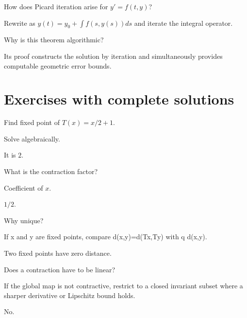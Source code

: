 \begin{problem}\label{prob:ii16-problem-11}
How does Picard iteration arise for $y'=f(t,y)$?
\end{problem}
\begin{solution}
Rewrite as $y(t)=y_0+\int f(s,y(s))ds$ and iterate the integral operator.
\end{solution}

\begin{problem}\label{prob:ii16-problem-12}
Why is this theorem algorithmic?
\end{problem}
\begin{solution}
Its proof constructs the solution by iteration and simultaneously provides computable geometric error bounds.
\end{solution}

\section{Exercises with complete solutions}

\begin{exercise}\label{exr:ii16-01}
Find fixed point of $T(x)=x/2+1$.
\end{exercise}
\begin{hint}
Solve algebraically.
\end{hint}
\begin{solution}
It is $2$.
\end{solution}

\begin{exercise}\label{exr:ii16-02}
What is the contraction factor?
\end{exercise}
\begin{hint}
Coefficient of $x$.
\end{hint}
\begin{solution}
$1/2$.
\end{solution}

\begin{exercise}\label{exr:ii16-03}
Why unique?
\end{exercise}
\begin{hint}
If x and y are fixed points, compare d(x,y)=d(Tx,Ty) with q d(x,y).
\end{hint}
\begin{solution}
Two fixed points have zero distance.
\end{solution}

\begin{exercise}\label{exr:ii16-04}
Does a contraction have to be linear?
\end{exercise}
\begin{hint}
If the global map is not contractive, restrict to a closed invariant subset where a sharper derivative or Lipschitz bound holds.
\end{hint}
\begin{solution}
No.
\end{solution}

